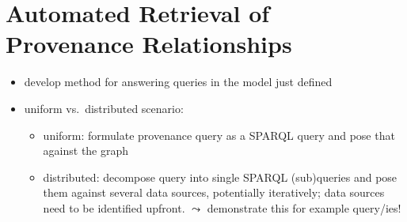 \chapter{Automated Retrieval of Provenance Relationships}
\label{chap:retrieval}

\begin{itemize}
  \item
    develop method for answering queries in the model just defined
  \item
    uniform vs.\ distributed scenario:
    \begin{itemize}
      \item
        uniform: formulate provenance query as a \gls{SPARQL} query and pose that against the graph
      \item
        distributed: decompose query into single \gls{SPARQL} (sub)queries and pose them against several data sources,
        potentially iteratively;
        data sources need to be identified upfront.
        $\leadsto$ demonstrate this for example query/ies!
        
    \end{itemize}
\end{itemize}


